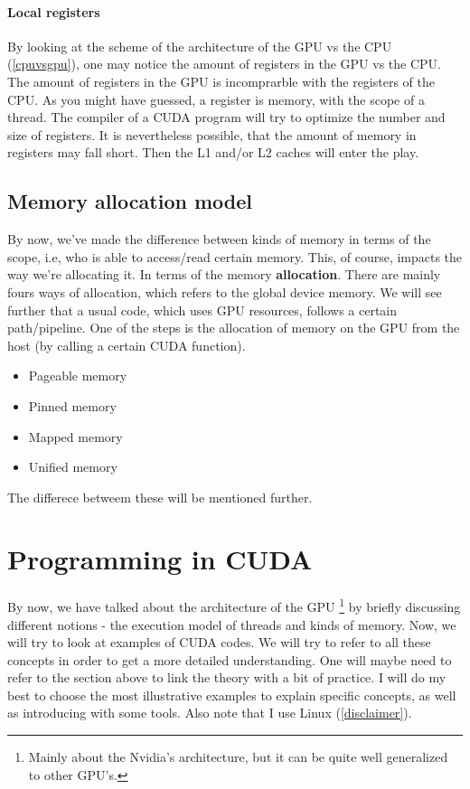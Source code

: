 \documentclass[12pt]{article}
\begin{document}
\paragraph{Local registers}By looking at the scheme of the architecture of the GPU vs the CPU (\autoref{cpuvsgpu}), one may notice the amount 
of registers in the GPU vs the CPU. The amount of registers in the GPU
is incomprarble with the registers of the CPU. As you might have guessed, a 
register is memory, with the scope of a thread. The compiler of a CUDA program will try to optimize the number and size of registers. 
It is nevertheless possible, that the amount of memory in registers may fall short. Then the L1 and/or L2 caches will enter the 
play.

\subsection{Memory allocation model}
By now, we've made the difference between kinds of memory in terms of the scope, i.e, 
who is able to access/read certain memory. This, of course, impacts the way we're allocating it. 
In terms of the memory \textbf{allocation}. There are mainly fours ways of allocation, which refers 
to the global device memory. 
We will see further that a usual
code, which uses GPU resources, follows a certain path/pipeline. One of the steps is the allocation of 
memory on the GPU from the host (by calling a certain CUDA function). 
\begin{itemize}
   \item Pageable memory
   \item Pinned memory
   \item Mapped memory
   \item Unified memory
\end{itemize}
The differece betweem these will be mentioned further.


\section{Programming in CUDA}

\paragraph{} By now, we have talked about the architecture of the GPU \footnote{Mainly about the Nvidia's architecture, but it 
can be quite well generalized to other GPU's.} by briefly discussing different notions - 
the execution model of threads and kinds of memory. Now, we will try to look at examples of CUDA codes. We will try to refer to 
all these concepts in order to get a more detailed understanding. One will maybe need to refer to the section above 
to link the theory with a bit of practice. I will do my best to choose the most illustrative examples to explain specific concepts, 
as well as introducing with some tools. 
Also note that I use Linux (\autoref{disclaimer}).
\end{document}
